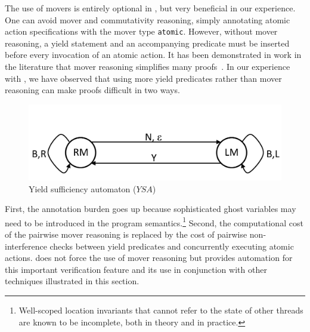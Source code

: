 The use of movers is entirely optional in \civl, but very beneficial
in our experience. One can avoid 
mover and commutativity reasoning, simply
annotating atomic action specifications with the mover type {\tt atomic}.
However, without mover reasoning,  a yield statement and an
accompanying predicate
must be inserted before every invocation of an atomic action.
It has been demonstrated in work in the literature that mover
reasoning simplifies many proofs~\cite{ElmasQT09}. 
In our experience with \civl, we have observed that using more yield
predicates rather than mover reasoning can make proofs difficult in two ways.
\begin{figure}
\begin{center}
\includegraphics[scale=0.25]{YieldTypeCheckingAutomaton.pdf}
\end{center} 
\caption{Yield sufficiency automaton ($YSA$)}
\label{fig:ysa}
\end{figure}
First, the annotation burden goes up because sophisticated ghost variables may need to be introduced in the 
program semantics.\footnote{Well-scoped location invariants that cannot refer to the state of other threads are known to be incomplete, 
both in theory and in practice.}
Second, the computational cost of the pairwise mover reasoning is replaced by the cost of pairwise non-interference checks between yield predicates 
and concurrently executing atomic actions. 
\civl does not force the use of mover
reasoning but provides automation for this important verification
feature and its use in conjunction with other techniques illustrated in
this section. 

